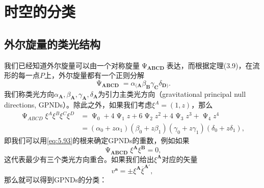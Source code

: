 
\section{时空的分类}
\subsection{外尔旋量的类光结构}

我们已经知道外尔旋量可以由一个对称旋量$\upPsi _{\boldsymbol{ABCD}}$表达，而根据定理(3.9)，在流形的每一点$P$上，外尔旋量都有一个正则分解
\begin{equation*}
	\upPsi _{\boldsymbol{ABCD}} =\alpha _{(\boldsymbol{A}} \beta _{\boldsymbol{B}} \gamma _{\boldsymbol{C}} \delta _{\boldsymbol{D})} .
\end{equation*}
我们称类光方向$\alpha _{\boldsymbol{A}} ,\beta _{\boldsymbol{A}} ,\gamma _{\boldsymbol{A}} ,\delta _{\boldsymbol{A}}$为引力主类光方向（gravitational principal null directions, GPNDs）。除此之外，如果我们考虑$\xi ^{A} =( 1,z)$，那么
\begin{equation}
	\begin{aligned}
		\upPsi _{ABCD} \xi ^{A} \xi ^{B} \xi ^{C} \xi ^{D} & =\upPsi _{0} +4\upPsi _{1} z+6\upPsi _{2} z^{2} +4\upPsi _{3} z^{3} +\upPsi _{4} z^{4}\\
		& =(\alpha _{0} +z\alpha _{1} )(\beta _{0} +z\beta _{1} )(\gamma _{0} +z\gamma _{1} )(\delta _{0} +z\delta _{1} ),
	\end{aligned}
	\label{eq:5.93}
\end{equation}
即我们可以用\ref{eq:5.93}的根来确定GPNDs的重数，例如如果
\begin{equation*}
	\upPsi _{\boldsymbol{ABCD}} \xi ^{\boldsymbol{A}} \xi ^{\boldsymbol{B}} =0,
\end{equation*}
这代表最少有三个类光方向重合。如果我们给出$\xi ^{\boldsymbol{A}}$对应的矢量
\begin{equation*}
	v^{\boldsymbol{a}} =\pm \xi ^{\boldsymbol{A}}\overline{\xi }^{\boldsymbol{A} '} ,
\end{equation*}
那么就可以得到GPNDs的分类：

